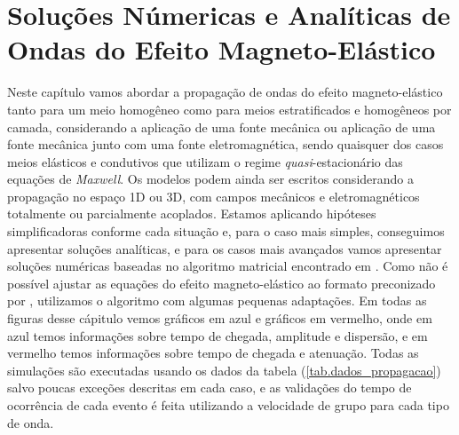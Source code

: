 \chapter{Solu\c{c}\~oes N\'umericas e Anal\'iticas de Ondas do Efeito Magneto-El\'astico}

Neste cap\'itulo vamos abordar a propaga\c{c}\~ao de ondas do efeito magneto-el\'astico tanto para um meio homog\^eneo como para meios estratificados e homog\^eneos por camada, considerando a aplica\c{c}\~ao de uma fonte mec\^anica ou aplica\c{c}\~ao de uma fonte mec\^anica junto com uma fonte eletromagn\'etica, sendo quaisquer dos casos meios el\'asticos e condutivos que utilizam o regime \textit{quasi}-estacion\'ario das equa\c{c}\~oes de \textit{Maxwell}. Os modelos podem ainda ser escritos considerando a propaga\c{c}\~ao no espa\c{c}o 1D ou 3D, com campos mec\^anicos e eletromagn\'eticos totalmente ou parcialmente acoplados. Estamos aplicando hip\'oteses simplificadoras conforme cada situa\c{c}\~ao e, para o caso mais simples, conseguimos apresentar solu\c{c}\~oes anal\'iticas, e para os casos mais avan\c{c}ados vamos apresentar solu\c{c}\~oes num\'ericas baseadas no algoritmo matricial encontrado em \cite{Ursin-1983}. Como n\~ao \'e poss\'ivel ajustar as equa\c{c}\~oes do efeito magneto-el\'astico ao formato preconizado por \cite{Ursin-1983}, utilizamos o algoritmo com algumas pequenas adapta\c{c}\~oes. Em todas as figuras desse c\'apitulo vemos gr\'aficos em azul e gr\'aficos em vermelho, onde em azul temos informa\c{c}\~oes sobre tempo de chegada, amplitude e dispers\~ao, e em vermelho temos informa\c{c}\~oes sobre tempo de chegada e atenua\c{c}\~ao. Todas as simula\c{c}\~oes s\~ao executadas usando os dados da tabela (\ref{tab.dados_propagacao}) salvo poucas exce\c{c}\~oes descritas em cada caso, e as valida\c{c}\~oes do tempo de ocorr\^encia de cada evento \'e feita utilizando a velocidade de grupo para cada tipo de onda.

